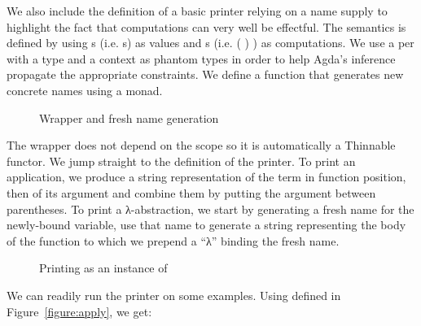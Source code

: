\label{section:printing}
We also include the definition of a basic printer relying on a name supply
to highlight the fact that computations can very well be effectful.
The  semantics is defined by using s (i.e. s)
as values and s (i.e. { ( ) })
as computations. We use a per with a type and a context as phantom types
in order to help Agda's inference propagate the appropriate constraints. We define
a function  that generates new concrete names using a  monad.

\begin{figure}[h]
\begin{minipage}{0.6\textwidth}
\end{minipage}
\begin{minipage}{0.3\textwidth}
\end{minipage}

\begin{minipage}{0.45\textwidth}
\end{minipage}
\begin{minipage}{0.45\textwidth}
\end{minipage}
\caption{Wrapper and fresh name generation}\label{fig:fresh}
\end{figure}

The wrapper  does not depend on the scope \AB{$\Gamma$} so it is automatically
a Thinnable functor. We jump straight
to the definition of the printer. To print an application, we produce
a string representation of the term in function position, then of its argument and combine
them by putting the argument between parentheses. To print a λ-abstraction,
we start by generating a fresh name for the newly-bound variable, use that
name to generate a string representing the body of the function to which we
prepend a ``λ'' binding the fresh name.

\begin{figure}[h]
\caption{Printing as an instance of \semrec{}}\label{fig:printing}
\end{figure}

We can readily run the printer on some examples. Using  defined
in Figure~\ref{figure:apply}, we get:

